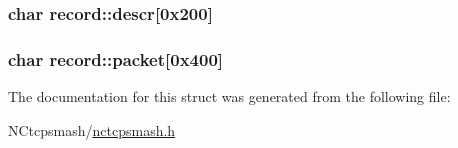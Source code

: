 \hypertarget{structrecord_c5821540379b383a222dc8a834582897}{
\subsubsection{\setlength{\rightskip}{0pt plus 5cm}char {\bf record::descr}\mbox{[}0x200\mbox{]}}}
\label{structrecord_c5821540379b383a222dc8a834582897}


\hypertarget{structrecord_f05696c59bf2b1370e3e786ef92f0bd2}{
\subsubsection{\setlength{\rightskip}{0pt plus 5cm}char {\bf record::packet}\mbox{[}0x400\mbox{]}}}
\label{structrecord_f05696c59bf2b1370e3e786ef92f0bd2}




The documentation for this struct was generated from the following file:\begin{CompactItemize}
\item 
NCtcpsmash/\hyperlink{nctcpsmash_8h}{nctcpsmash.h}\end{CompactItemize}

